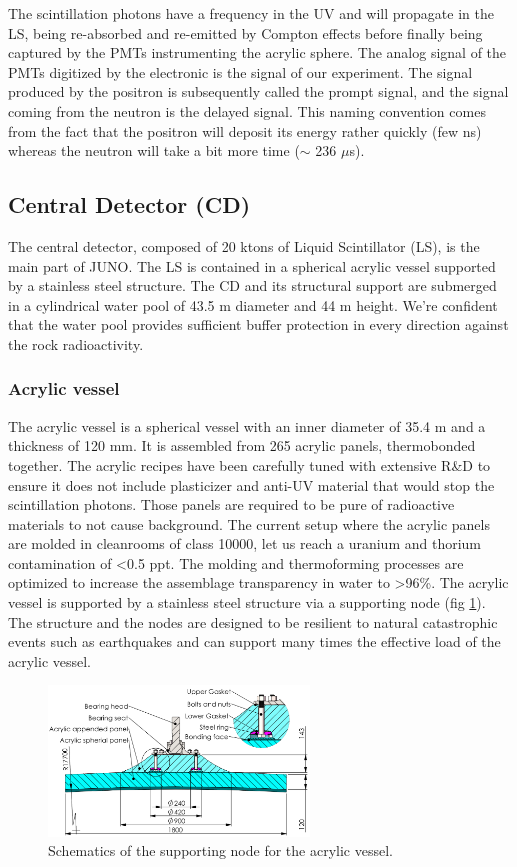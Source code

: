 \documentclass[../main.tex]{subfiles}
\begin{document}
The scintillation photons have a frequency in the UV and will propagate in the LS, being re-absorbed and re-emitted by Compton effects before finally being captured by the PMTs instrumenting the acrylic sphere. The analog signal of the PMTs digitized by the electronic is the signal of our experiment. The signal produced by the positron is subsequently called the prompt signal, and the signal coming from the neutron is the delayed signal. This naming convention comes from the fact that the positron will deposit its energy rather quickly (few ns) whereas the neutron will take a bit more time ($\sim$ 236 $\mu$s).

\subsection{Central Detector (CD)}
\label{sec:juno:CD}

The central detector, composed of 20 ktons of Liquid Scintillator (LS), is the main part of JUNO. The LS is contained in a spherical acrylic vessel supported by a stainless steel structure. The CD and its structural support are submerged in a cylindrical water pool of 43.5 m diameter and 44 m height. We're confident that the water pool provides sufficient buffer protection in every direction against the rock radioactivity.
\subsubsection{Acrylic vessel}
The acrylic vessel is a spherical vessel with an inner diameter of 35.4 m and a thickness of 120 mm. It is assembled from 265 acrylic panels, thermobonded together. The acrylic recipes have been carefully tuned with extensive R\&D to ensure it does not include plasticizer and anti-UV material that would stop the scintillation photons.
Those panels are required to be pure of radioactive materials to not cause background. The current setup where the acrylic panels are molded in cleanrooms of class 10000, let us reach a uranium and thorium contamination of <0.5 ppt. The molding and thermoforming processes are optimized to increase the assemblage transparency in water to >96\%. The acrylic vessel is supported by a stainless steel structure via a supporting node (fig \ref{fig:juno:sup_node}). The structure and the nodes are designed to be resilient to natural catastrophic events such as earthquakes and can support many times the effective load of the acrylic vessel.

\begin{figure}[ht]
  \centering
  \includegraphics[height=4cm]{images/juno/node_b.png}
  \caption{Schematics of the supporting node for the acrylic vessel.}
  \label{fig:juno:sup_node}
\end{figure}
\end{document}
